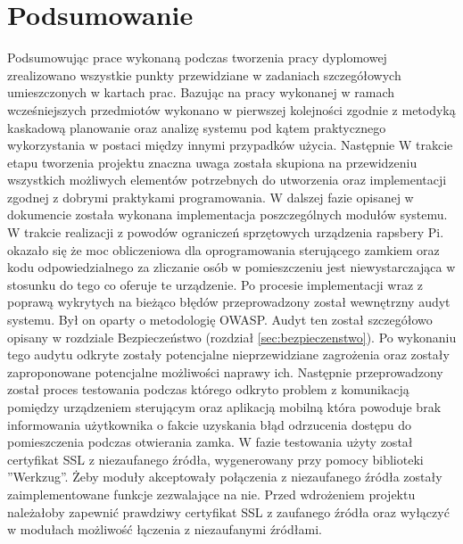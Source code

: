 \newpage
\section{Podsumowanie} \label{sec:podsumowanie}
	Podsumowując prace wykonaną podczas tworzenia pracy dyplomowej zrealizowano wszystkie punkty przewidziane w zadaniach szczegółowych umieszczonych w kartach prac. Bazując na pracy wykonanej w ramach wcześniejszych przedmiotów wykonano w pierwszej kolejności zgodnie z metodyką kaskadową  planowanie oraz analizę systemu pod kątem praktycznego wykorzystania w postaci między innymi przypadków użycia. Następnie W trakcie etapu tworzenia projektu znaczna uwaga została skupiona na  przewidzeniu wszystkich możliwych  elementów potrzebnych do utworzenia oraz implementacji zgodnej z dobrymi praktykami programowania. W dalszej fazie opisanej w dokumencie została wykonana implementacja poszczególnych modułów systemu. W trakcie realizacji z powodów ograniczeń sprzętowych urządzenia rapsbery Pi. okazało się że moc obliczeniowa dla oprogramowania sterującego zamkiem oraz kodu odpowiedzialnego za zliczanie osób w pomieszczeniu jest niewystarczająca w stosunku do tego co oferuje te urządzenie. 
	Po procesie implementacji wraz z poprawą wykrytych na bieżąco błędów przeprowadzony został wewnętrzny audyt  systemu. Był on oparty o metodologię OWASP. Audyt ten został szczegółowo opisany w rozdziale Bezpieczeństwo (rozdział \ref{sec:bezpieczenstwo}). Po wykonaniu tego audytu odkryte zostały potencjalne nieprzewidziane zagrożenia oraz zostały zaproponowane potencjalne możliwości naprawy ich. Następnie przeprowadzony został proces testowania podczas którego odkryto problem z komunikacją pomiędzy urządzeniem sterującym oraz aplikacją mobilną która powoduje brak informowania użytkownika o fakcie uzyskania błąd odrzucenia dostępu do pomieszczenia podczas otwierania zamka. W fazie testowania użyty został certyfikat SSL z niezaufanego źródła, wygenerowany przy pomocy biblioteki ''Werkzug''. Żeby moduły akceptowały połączenia z niezaufanego źródła zostały zaimplementowane funkcje zezwalające na nie. Przed wdrożeniem projektu należałoby zapewnić prawdziwy certyfikat SSL z zaufanego źródła oraz wyłączyć w modułach możliwość łączenia z niezaufanymi źródłami.               
